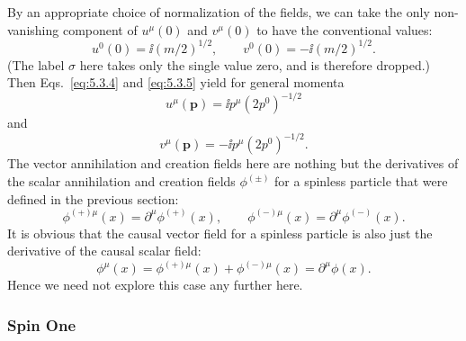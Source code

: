By an appropriate choice of normalization of the fields, we can take the only
non-vanishing component of $u^\mu(0)$ and $v^\mu(0)$ to have the conventional
values:
\[
  u^0(0)=\ii(m/2)^{1/2},\qquad v^0(0)=-\ii(m/2)^{1/2}.
\]
(The label $\sigma$ here takes only the single value zero, and is therefore
dropped.) Then Eqs.~\eqref{eq:5.3.4} and \eqref{eq:5.3.5} yield for general momenta
\begin{equation}
  u^\mu(\mathbf{p})=\ii p^\mu(2p^0)^{-1/2}
  \tag{5.3.16}\label{eq:5.3.16}
\end{equation}
and
\begin{equation}
  v^\mu(\mathbf{p})=-\ii p^\mu(2p^0)^{-1/2}.
  \tag{5.3.17}\label{eq:5.3.17}
\end{equation}
The vector annihilation and creation fields here are nothing but the
derivatives of the scalar annihilation and creation fields $\phi^{(\pm)}$ for a
spinless particle that were defined in the previous section:
\begin{equation}
  \phi^{(+)\mu}(x)=\partial^\mu\phi^{(+)}(x),\qquad
  \phi^{(-)\mu}(x)=\partial^\mu\phi^{(-)}(x).
  \tag{5.3.18}\label{eq:5.3.18}
\end{equation}
It is obvious that the causal vector field for a spinless particle is also just
the derivative of the causal scalar field:
\begin{equation}
  \phi^\mu(x)=\phi^{(+)\mu}(x)+\phi^{(-)\mu}(x)
  =\partial^\mu\phi(x).
  \tag{5.3.19}\label{eq:5.3.19}
\end{equation}
Hence we need not explore this case any further here.

\subsubsection*{Spin One}

